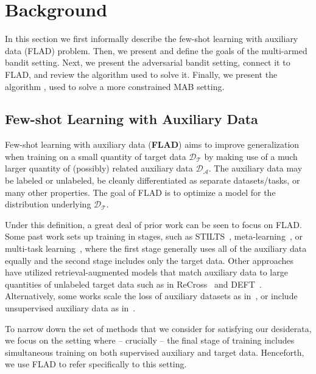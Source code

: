 \section{Background}
In this section we first informally describe the few-shot learning with auxiliary data (FLAD) problem. Then, we present and define the goals of the multi-armed bandit setting. Next, we present the adversarial bandit setting, connect it to FLAD, and review the \ex{} algorithm \citep{auer2002nonstochastic} used to solve it. Finally, we present the \ucb{} algorithm \citep{auer2002finite}, used to solve a more constrained MAB setting.

\subsection{Few-shot Learning with Auxiliary Data}
Few-shot learning with auxiliary data (\textbf{FLAD}) aims to improve generalization when training on a small quantity of target data $\mathcal{D}_{\mathcal{T}}$ by making use of a much larger quantity of (possibly) related auxiliary data $\mathcal{D}_{\mathcal{A}}$. The auxiliary data may be labeled or unlabeled, be cleanly differentiated as separate datasets/tasks, or many other properties. The goal of FLAD is to optimize a model for the distribution underlying $\mathcal{D}_{\mathcal{T}}$.

Under this definition, a great deal of prior work can be seen to focus on FLAD.
Some past work sets up training in stages, such as STILTS~\citep{phang2018sentence}, meta-learning~\citep{bansal-etal-2020-self}, or multi-task learning~\citep{aghajanyan-etal-2021-muppet}, where the first stage generally uses all of the auxiliary data equally and the second stage includes only the target data. Other approaches have utilized retrieval-augmented models that match auxiliary data to large quantities of unlabeled target data such as in ReCross~\citep{Lin2022UnsupervisedCG} and DEFT~\citep{Ivison2022DEFT}. Alternatively, some works scale the loss of auxiliary datasets as in~\citet{Verboven2022}, or include unsupervised auxiliary data as in~\citet{deryAANG2022}.

To narrow down the set of methods that we consider for satisfying our desiderata, we focus on the setting where -- crucially -- the final stage of training includes simultaneous training on both supervised auxiliary and target data. Henceforth, we use FLAD to refer specifically to this setting.


